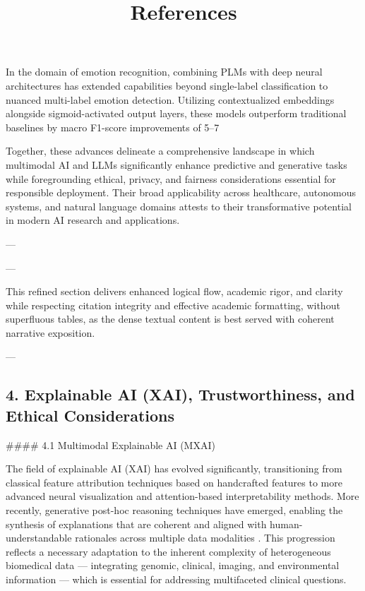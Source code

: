 \documentclass[11pt]{article}
\begin{document}
In the domain of emotion recognition, combining PLMs with deep neural architectures has extended capabilities beyond single-label classification to nuanced multi-label emotion detection. Utilizing contextualized embeddings alongside sigmoid-activated output layers, these models outperform traditional baselines by macro F1-score improvements of 5–7%

Together, these advances delineate a comprehensive landscape in which multimodal AI and LLMs significantly enhance predictive and generative tasks while foregrounding ethical, privacy, and fairness considerations essential for responsible deployment. Their broad applicability across healthcare, autonomous systems, and natural language domains attests to their transformative potential in modern AI research and applications.

---

\title{References}
\maketitle


---

This refined section delivers enhanced logical flow, academic rigor, and clarity while respecting citation integrity and effective academic formatting, without superfluous tables, as the dense textual content is best served with coherent narrative exposition.

---

\subsection{4. Explainable AI (XAI), Trustworthiness, and Ethical Considerations}

#### 4.1 Multimodal Explainable AI (MXAI)

The field of explainable AI (XAI) has evolved significantly, transitioning from classical feature attribution techniques based on handcrafted features to more advanced neural visualization and attention-based interpretability methods. More recently, generative post-hoc reasoning techniques have emerged, enabling the synthesis of explanations that are coherent and aligned with human-understandable rationales across multiple data modalities \cite{ref13,ref24,ref25}. This progression reflects a necessary adaptation to the inherent complexity of heterogeneous biomedical data — integrating genomic, clinical, imaging, and environmental information — which is essential for addressing multifaceted clinical questions.
\end{document}
